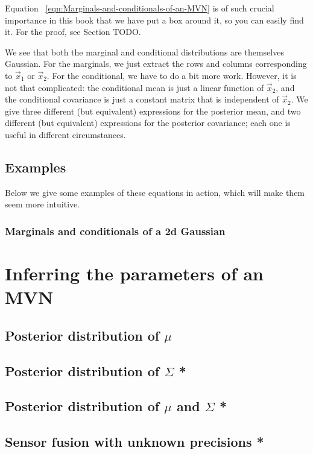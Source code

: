 Equation ~\eqref{eqn:Marginals-and-conditionals-of-an-MVN} is of such crucial importance in this book that we have put a box around it, so you can easily find it. For the proof, see Section TODO.

We see that both the marginal and conditional distributions are themselves Gaussian. For the marginals, we just extract the rows and columns corresponding to $\vec{x}_1$ or $\vec{x}_2$. For the conditional, we have to do a bit more work. However, it is not that complicated: the conditional mean is just a linear function of $\vec{x}_2$, and the conditional covariance is just a constant matrix that is independent of $\vec{x}_2$. We give three different (but equivalent) expressions for the posterior mean, and two different (but equivalent) expressions for the posterior covariance; each one is useful in different circumstances.


\subsection{Examples}
Below we give some examples of these equations in action, which will make them seem more intuitive.


\subsubsection{Marginals and conditionals of a 2d Gaussian}


\section{Inferring the parameters of an MVN}


\subsection{Posterior distribution of $\mu$}



\subsection{Posterior distribution of $\Sigma$ *}



\subsection{Posterior distribution of $\mu$ and $\Sigma$ *}
\label{sec:Posterior-distribution-of-mu-and-Sigma}


\subsection{Sensor fusion with unknown precisions *}

